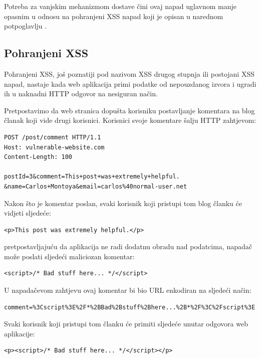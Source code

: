 \documentclass[12pt, oneside, onecolumn]{book}
\begin{document}
{Potreba za vanjskim mehanizmom dostave čini ovaj napad uglavnom manje opasnim u odnosu na pohranjeni XSS napad koji je opisan u narednom potpoglavlju \cite{xssref}.

\subsection{Pohranjeni XSS}
Pohranjeni XSS, još poznatiji pod nazivom XSS drugog stupnja ili postojani XSS napad, nastaje kada web aplikacija primi podatke od nepouzdanog izvora i ugradi ih u naknadni HTTP odgovor na nesiguran način. 

Pretpostavimo da web stranica dopušta korisniku postavljanje komentara na blog članak koji vide drugi korisnici. Korisnici svoje komentare šalju HTTP zahtjevom:

\pagebreak

\begin{verbatim}
POST /post/comment HTTP/1.1
Host: vulnerable-website.com
Content-Length: 100

postId=3&comment=This+post+was+extremely+helpful.
&name=Carlos+Montoya&email=carlos%40normal-user.net
\end{verbatim}

Nakon što je komentar poslan, svaki korisnik koji pristupi tom blog članku će vidjeti sljedeće:

\begin{verbatim}
<p>This post was extremely helpful.</p>
\end{verbatim}

pretpostavljajuću da aplikacija ne radi dodatnu obradu nad podatcima, napadač može poslati sljedeći maliciozan komentar:

\begin{verbatim}
<script>/* Bad stuff here... */</script>
\end{verbatim}

U napadačevom zahtjevu ovaj komentar bi bio URL enkodiran na sljedeći način:

\begin{verbatim}
comment=%3Cscript%3E%2F*%2BBad%2Bstuff%2Bhere...%2B*%2F%3C%2Fscript%3E
\end{verbatim}

Svaki korisnik koji pristupi tom članku će primiti sljedeće unutar odgovora web aplikacije:

\begin{verbatim}
<p><script>/* Bad stuff here... */</script></p>
\end{verbatim}

}
\end{document}
